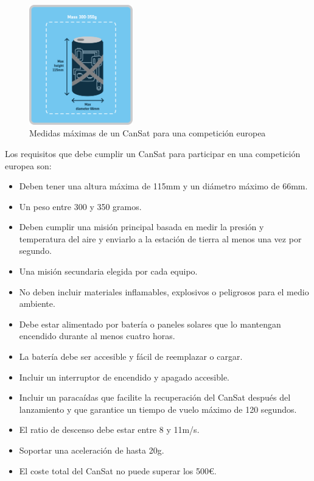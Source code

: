 \begin{figure}
    \centering
    \includegraphics[width=0.4\textwidth]{Imagenes/Bitmap/cansat_size}
    \caption{Medidas máximas de un CanSat para una competición europea}
    \label{fig:cansat_Size}
\end{figure}

Los requisitos que debe cumplir un CanSat para participar en una competición europea son:
\begin{itemize}
    \item Deben tener una altura máxima de 115mm y un diámetro máximo de 66mm.
    \item Un peso entre 300 y 350 gramos.
    \item Deben cumplir una misión principal basada en medir la presión y temperatura del aire y enviarlo a la estación de tierra al menos una vez por segundo.
    \item Una misión secundaria elegida por cada equipo.
    \item No deben incluir materiales inflamables, explosivos o peligrosos para el medio ambiente.
    \item Debe estar alimentado por batería o paneles solares que lo mantengan encendido durante al menos cuatro horas.
    \item La batería debe ser accesible y fácil de reemplazar o cargar.
    \item Incluir un interruptor de encendido y apagado accesible.
    \item Incluir un paracaídas que facilite la recuperación del CanSat después del lanzamiento y que garantice un tiempo de vuelo máximo de 120 segundos.
    \item El ratio de descenso debe estar entre 8 y 11m/s.
    \item Soportar una aceleración de hasta 20g.
    \item El coste total del CanSat no puede superar los 500€.
\end{itemize}


